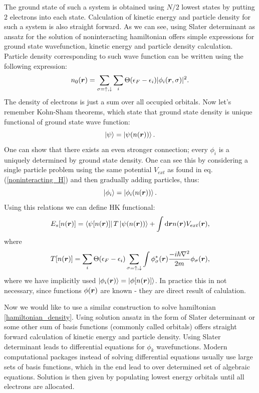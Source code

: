 \documentclass[openany, longbibliography,slovene,a4paper,12pt]{article}
\def\vec#1{\mbox{\boldmath$#1$}}
\newcommand{\dif}{\mathrm{d}}
\begin{document}
 The ground state of such a system is obtained using $N/2$ lowest states by
 putting $2$  electrons into each state. Calculation of kinetic energy and particle
 density for such a system is also straight forward. As we can see, using Slater
 determinant as ansatz for the solution of noninteracting hamiltonian offers
 simple expressions for ground state wavefunction, kinetic energy and particle density
 calculation. Particle density corresponding to such wave function can be written
 using the following expression:
 \begin{equation} \label{KS_density}
   n_0(\vec r) = \sum_{\sigma=\uparrow,\downarrow}\sum_i\Theta(\epsilon_F-\epsilon_i)|\phi_i(\vec r, \sigma)|^2.
 \end{equation}
 The density of electrons is just a sum over all occupied orbitals. Now let's
 remember Kohn-Sham theorems, which state that ground state density is unique
 functional of ground state wave function:
 \begin{equation}
   \ket{\psi}= \ket{\psi(n(\vec r))}.
 \end{equation}
 One can show that there exists an even stronger connection; every $\phi_i$ is a
 uniquely determined by ground state density. One can see this by considering a single
 particle problem using the same potential $V_{ext}$ as found in eq.
 (\ref{noninteracting_H}) and then gradually adding particles, thus:
 \begin{equation}
   \ket{\phi_i}= \ket{\phi_i(n(\vec r))}.
 \end{equation}
 Using this relations we can define HK functional:
 \begin{equation}
   E_s[n(\vec r)] = \bra{\psi[n(\vec r)]}T \ket{\psi(n(\vec r))} + \int \dif \vec r n(\vec r) V_{ext}(\vec r),
   \end{equation}
 where
\begin{equation} \label{KS_kinetic_term}
   T[n(\vec r)] = \sum_i\Theta(\epsilon_F-\epsilon_i)  \sum_{\sigma=\uparrow,\downarrow}\int \phi^*_\sigma(\vec r)\frac{-i\hbar\nabla^2}{2m}\phi_\sigma(\vec r),
 \end{equation}
 where we have implicitly used $\ket{\phi_i(\vec r)} = \ket{ \phi[n(\vec r)] }$.
 In practice this in not necessary, since functions $\phi(\vec r)$ are known -
 they are direct result of calulation.
 
Now we would like to use a similar construction to solve hamiltonian
\ref{hamiltonian_density}. Using solution ansatz in the form of Slater
determinant or some other sum of basis functions (commonly called orbitals) offers straight forward
calculation of kinetic energy and  particle density. Using Slater determinant leads to
differential equations for $\phi_k$ wavefunctions. Modern computational packages
instead of solving differential equations usually use
large sets of basis functions, which in the end lead to over determined set of
algebraic equations. Solution is then given by populating lowest energy orbitals until all electrons
are allocated.
 
\end{document}
